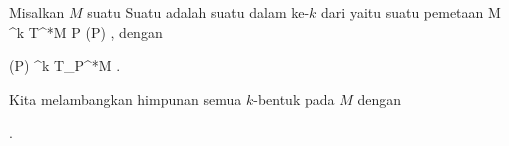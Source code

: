\setcounter{section}{14}


{}
{

Misalkan $M$ suatu
Suatu
 {} {}
adalah suatu
dalam
ke-$k$ dari
yaitu suatu pemetaan
\maabbeledisp {\omega} { M } { \bigwedge^k T^*M
} { P } { \omega(P)
} {,}
dengan

\mavergleichskette
{\vergleichskette
{ \omega(P)
}
{ \in }{ \bigwedge^k T_P^*M
}
{  }{
}
{    }{
}
{   }{
}
}
{}{}{.}

}

Kita melambangkan himpunan semua $k$-bentuk pada $M$ dengan

 { . }

